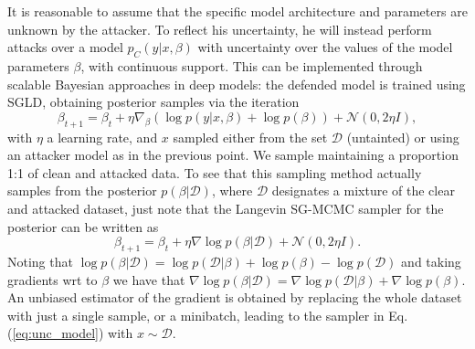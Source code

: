 It is reasonable to assume that the specific model architecture and parameters %
are unknown by the attacker. %
To reflect his uncertainty, he will instead perform attacks over
a model $p_C(y|x,\beta)$ with uncertainty  
over the values of the model parameters $\beta$, with continuous
support. 
This can be implemented through scalable Bayesian approaches
in deep models: the defended model is trained using SGLD, obtaining posterior samples via the iteration
\begin{equation}\label{eq:unc_model}
\beta_{t+1} = \beta_t + \eta \nabla_\beta (\log p(y|x, \beta) + \log p(\beta)) + \mathcal{N}(0, 2\eta I),
\end{equation}
with $\eta$ a learning rate, and $x$ sampled either from
the set $\mathcal{D}$ (untainted) or using an attacker model as in the previous point. We sample maintaining
a proportion 1:1 of clean and attacked data.  To see that this sampling method actually samples
from the  posterior $p(\beta| \mathcal{D})$,
where 
$\mathcal{D}$ designates a mixture of the clear and attacked dataset, just note that the Langevin SG-MCMC sampler for the posterior can be written as
$$
\beta_{t+1} = \beta_{t} + \eta \nabla \log p(\beta | \mathcal{D})  + \mathcal{N}(0, 2\eta I).
$$
Noting that $\log p(\beta | \mathcal{D}) = \log p(\mathcal{D} | \beta ) + \log p(\beta) - \log p(\mathcal{D})$ and taking gradients wrt to $\beta$ we have that $\nabla \log p(\beta | \mathcal{D}) = \nabla \log p(\mathcal{D} | \beta ) + \nabla \log p(\beta)$. An unbiased estimator of the gradient is obtained by replacing the whole dataset with just a single sample, or a minibatch, leading to the sampler in Eq. (\ref{eq:unc_model})
with $x \sim \mathcal{D}$. \\





